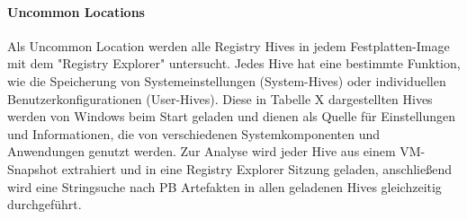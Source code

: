 \paragraph*{Uncommon Locations}
Als Uncommon Location werden alle Registry Hives in jedem Festplatten-Image mit dem "Registry Explorer" untersucht.
Jedes Hive hat eine bestimmte Funktion, wie die Speicherung von Systemeinstellungen (System-Hives) oder individuellen Benutzerkonfigurationen (User-Hives). Diese in Tabelle X dargestellten Hives werden von Windows beim Start geladen und dienen als Quelle für Einstellungen und Informationen, die von verschiedenen Systemkomponenten und Anwendungen genutzt werden.	
Zur Analyse wird jeder Hive aus einem VM-Snapshot extrahiert und in eine Registry Explorer Sitzung geladen, anschließend wird eine Stringsuche nach PB Artefakten in allen geladenen Hives gleichzeitig durchgeführt.

